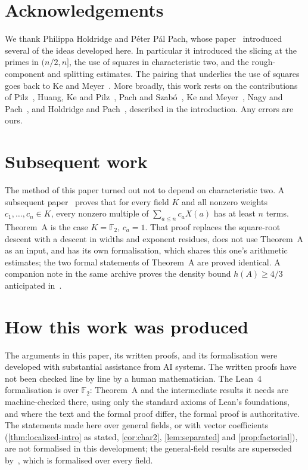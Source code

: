 \documentclass[11pt]{amsart}
\numberwithin{equation}{section}
\theoremstyle{definition}
\theoremstyle{remark}
\newcommand{\Ft}{\mathbb{F}_2}
\begin{document}
\section*{Acknowledgements}
We thank Philippa Holdridge and P\'eter P\'al Pach, whose paper~\cite{HP} introduced several of the ideas developed here. In particular it introduced the slicing at the primes in $(n/2,n]$, the use of squares in characteristic two, and the rough-component and splitting estimates. The pairing that underlies the use of squares goes back to Ke and Meyer~\cite{KM}. More broadly, this work rests on the contributions of Pilz~\cite{Pilz}, Huang, Ke and Pilz~\cite{HKP}, Pach and Szab\'o~\cite{PS}, Ke and Meyer~\cite{KM}, Nagy and Pach~\cite{NP}, and Holdridge and Pach~\cite{HP}, described in the introduction. Any errors are ours.

\section*{Subsequent work}
The method of this paper turned out not to depend on characteristic two. A subsequent paper~\cite{Weighted} proves that for every field $K$ and all nonzero weights $c_1,\ldots,c_n\in K$, every nonzero multiple of $\sum_{a\le n}c_aX(a)$ has at least $n$ terms. Theorem~A is the case $K=\Ft$, $c_a=1$. That proof replaces the square-root descent with a descent in widths and exponent residues, does not use Theorem~A as an input, and has its own formalisation, which shares this one's arithmetic estimates; the two formal statements of Theorem~A are proved identical. A companion note in the same archive proves the density bound $h(A)\ge4/3$ anticipated in~\cite[Remark~1.9]{HP}.

\section*{How this work was produced}
The arguments in this paper, its written proofs, and its formalisation were developed with substantial assistance from AI systems. The written proofs have not been checked line by line by a human mathematician. The Lean~4 formalisation is over $\Ft$: Theorem~A and the intermediate results it needs are machine-checked there, using only the standard axioms of Lean's foundations, and where the text and the formal proof differ, the formal proof is authoritative. The statements made here over general fields, or with vector coefficients (\cref{thm:localized-intro} as stated, \cref{cor:char2}, \cref{lem:separated} and \cref{prop:factorial}), are not formalised in this development; the general-field results are superseded by~\cite{Weighted}, which is formalised over every field.
\end{document}
